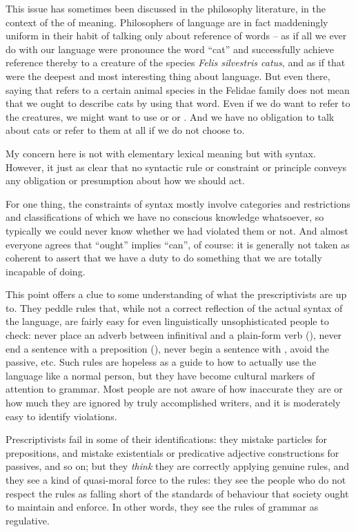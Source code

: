 \documentclass[output=paper]{langscibook}
\begin{document}
This issue has sometimes been discussed in the philosophy literature, in the context of the  of meaning.  Philosophers of language are in fact maddeningly uniform in their habit of talking only about reference of words -- as if all we ever do with our language were pronounce the word ``cat'' and successfully achieve reference thereby to a creature of the species \textit{Felis silvestris catus}, and as if that were the deepest and most interesting thing about language.  But even there, saying that  refers to a certain animal species in the Felidae family does not mean that we ought to describe cats by using that word.  Even if we do want to refer to the creatures, we might want to use  or  or .  And we have no obligation to talk about cats or refer to them at all if we do not choose to.

My concern here is not with elementary lexical meaning but with syntax. However, it just as clear that no syntactic rule or constraint or principle conveys any obligation or presumption about how we should act.

For one thing, the constraints of syntax mostly involve categories and restrictions and classifications of which we have no conscious knowledge whatsoever, so typically we could never know whether we had violated them or not.  And almost everyone agrees that ``ought'' implies ``can'', of course: it is generally not taken as coherent to assert that we have a duty to do something that we are totally incapable of doing.

This point offers a clue to some understanding of what the prescriptivists are up to.  They peddle rules that, while not a correct reflection of the actual syntax of the language, are fairly easy for even linguistically unsophisticated people to check: never place an adverb between infinitival  and a plain-form verb (), never end a sentence with a preposition (), never begin a sentence with , avoid the passive, etc. Such rules are hopeless as a guide to how to actually use the language like a normal person, but they have become cultural markers of attention to grammar. Most people are not aware of how inaccurate they are or how much they are ignored by truly accomplished writers, and it is moderately easy to identify violations.

Prescriptivists fail in some of their identifications: they mistake particles for prepositions, and mistake existentials or predicative adjective constructions for passives, and so on; but they \emph{think} they are correctly applying genuine rules, and they see a kind of quasi-moral force to the rules: they see the people who do not respect the rules as falling short of the standards of behaviour that society ought to maintain and enforce.  In other words, they see the rules of grammar as regulative.
\end{document}
